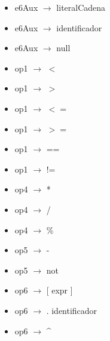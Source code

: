 \documentclass[11pt]{article}
\begin{document}
\begin{itemize}
            \item e6Aux  $\rightarrow$ literalCadena
            \item e6Aux  $\rightarrow$ identificador
            \item e6Aux  $\rightarrow$ null
            \item op1 $\rightarrow$ $<$
            \item op1 $\rightarrow$ $>$
            \item op1 $\rightarrow$ $<=$
            \item op1 $\rightarrow$ $>=$
            \item op1 $\rightarrow$ ==
            \item op1 $\rightarrow$ !=
            \item op4 $\rightarrow$ *
            \item op4 $\rightarrow$ /
            \item op4 $\rightarrow$ \%
            \item op5 $\rightarrow$ -
            \item op5 $\rightarrow$ not
            \item op6 $\rightarrow$ [ expr ]
            \item op6 $\rightarrow$ . identificador
            \item op6 $\rightarrow$ \^{}
        \end{itemize}
\end{document}
